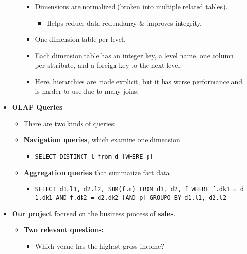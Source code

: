 \begin{multicols}{2}
\begin{itemize}
\begin{itemize}
    \begin{itemize}
        \item
      Dimensions are normalized (broken into multiple related tables).

      \begin{itemize}
            \item
        Helps reduce data redundancy \& improves integrity.
      \end{itemize}
    \item
      One dimension table per level.
    \item
      Each dimension table has an integer key, a level name, one column
      per attribute, and a foreign key to the next level.
    \item
      Here, hierarchies are made explicit, but it has worse performance
      and is harder to use due to many joins.
    \end{itemize}
  \end{itemize}
\item
  \textbf{OLAP Queries}

  \begin{itemize}
    \item
    There are two kinds of queries:
  \item
    \textbf{Navigation queries}, which examine one dimension:

    \begin{itemize}
        \item
      \texttt{SELECT\ DISTINCT\ l\ from\ d\ {[}WHERE\ p{]}}
    \end{itemize}
  \item
    \textbf{Aggregation queries} that summarize fact data

    \begin{itemize}
        \item
      \texttt{SELECT\ d1.l1,\ d2.l2,\ SUM(f.m)\ FROM\ d1,\ d2,\ f\ WHERE\ f.dk1\ =\ d1.dk1\ AND\ f.dk2\ =\ d2.dk2\ {[}AND\ p{]}\ GROUPO\ BY\ d1.l1,\ d2.l2}
    \end{itemize}
  \end{itemize}
\item
  \textbf{Our project} focused on the business process of
  \textbf{sales}.

  \begin{itemize}
    \item
    \textbf{Two relevant questions:}

    \begin{itemize}
        \item
      Which venue has the highest gross income?


\end{itemize}
\end{itemize}
\end{itemize}
\end{multicols}
